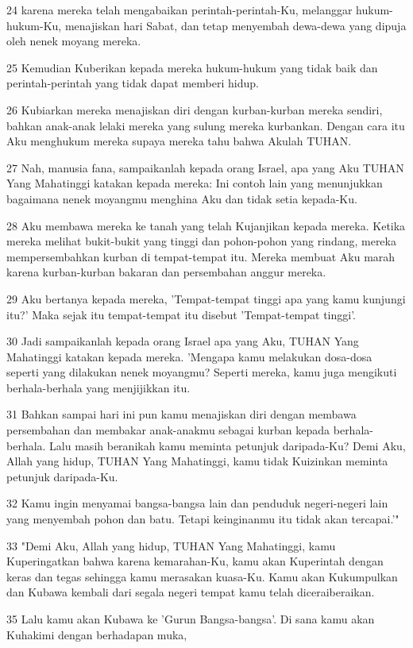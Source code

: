 \par 24 karena mereka telah mengabaikan perintah-perintah-Ku, melanggar hukum-hukum-Ku, menajiskan hari Sabat, dan tetap menyembah dewa-dewa yang dipuja oleh nenek moyang mereka.
\par 25 Kemudian Kuberikan kepada mereka hukum-hukum yang tidak baik dan perintah-perintah yang tidak dapat memberi hidup.
\par 26 Kubiarkan mereka menajiskan diri dengan kurban-kurban mereka sendiri, bahkan anak-anak lelaki mereka yang sulung mereka kurbankan. Dengan cara itu Aku menghukum mereka supaya mereka tahu bahwa Akulah TUHAN.
\par 27 Nah, manusia fana, sampaikanlah kepada orang Israel, apa yang Aku TUHAN Yang Mahatinggi katakan kepada mereka: Ini contoh lain yang menunjukkan bagaimana nenek moyangmu menghina Aku dan tidak setia kepada-Ku.
\par 28 Aku membawa mereka ke tanah yang telah Kujanjikan kepada mereka. Ketika mereka melihat bukit-bukit yang tinggi dan pohon-pohon yang rindang, mereka mempersembahkan kurban di tempat-tempat itu. Mereka membuat Aku marah karena kurban-kurban bakaran dan persembahan anggur mereka.
\par 29 Aku bertanya kepada mereka, 'Tempat-tempat tinggi apa yang kamu kunjungi itu?' Maka sejak itu tempat-tempat itu disebut 'Tempat-tempat tinggi'.
\par 30 Jadi sampaikanlah kepada orang Israel apa yang Aku, TUHAN Yang Mahatinggi katakan kepada mereka. 'Mengapa kamu melakukan dosa-dosa seperti yang dilakukan nenek moyangmu? Seperti mereka, kamu juga mengikuti berhala-berhala yang menjijikkan itu.
\par 31 Bahkan sampai hari ini pun kamu menajiskan diri dengan membawa persembahan dan membakar anak-anakmu sebagai kurban kepada berhala-berhala. Lalu masih beranikah kamu meminta petunjuk daripada-Ku? Demi Aku, Allah yang hidup, TUHAN Yang Mahatinggi, kamu tidak Kuizinkan meminta petunjuk daripada-Ku.
\par 32 Kamu ingin menyamai bangsa-bangsa lain dan penduduk negeri-negeri lain yang menyembah pohon dan batu. Tetapi keinginanmu itu tidak akan tercapai.'"
\par 33 "Demi Aku, Allah yang hidup, TUHAN Yang Mahatinggi, kamu Kuperingatkan bahwa karena kemarahan-Ku, kamu akan Kuperintah dengan keras dan tegas sehingga kamu merasakan kuasa-Ku. Kamu akan Kukumpulkan dan Kubawa kembali dari segala negeri tempat kamu telah diceraiberaikan.
\par 35 Lalu kamu akan Kubawa ke 'Gurun Bangsa-bangsa'. Di sana kamu akan Kuhakimi dengan berhadapan muka,
